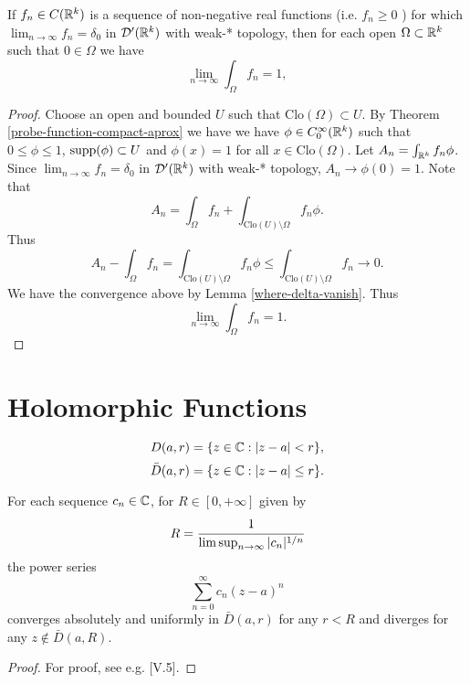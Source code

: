 \documentclass[main.tex]{subfiles}
\begin{document}
\begin{lemma}
If $f_n\in C(\mathbb{R}^k)$ is a sequence of non-negative real functions (i.e. $f_n \geq 0$ ) for which 
$\lim_{n\to\infty} f_n = \delta_0$ in $\mathcal{D}'(\mathbb{R}^k)$ with weak-* topology, then for each open $\Omega\subset \mathbb{R}^k$ such that $0\in\Omega$ we have
\begin{equation}
\lim_{n\to\infty}\int_{\Omega} f_n = 1,
\end{equation} 
\end{lemma}
\begin{proof}
Choose an open and bounded $U$ such that $\text{Clo}(\Omega)\subset U$.
By Theorem \ref{probe-function-compact-aprox} we have we have $\phi\in C^\infty_0(\mathbb{R}^k)$ such that $0 \leq \phi \leq 1$, $\text{supp}(\phi)\subset U$ and $\phi(x) = 1$ for all $x\in \text{Clo}(\Omega)$.
Let $A_n = \int_{\mathbb{R}^k}f_n \phi$. Since $\lim_{n\to\infty} f_n = \delta_0$ in $\mathcal{D}'(\mathbb{R}^k)$ with weak-* topology, $A_n\to \phi(0)=1$.
Note that
\begin{equation}
A_n = \int_\Omega f_n + \int_{\text{Clo}(U) \setminus \Omega} f_n \phi.
\end{equation}
Thus
\begin{equation}
A_n - \int_\Omega f_n = \int_{\text{Clo}(U) \setminus \Omega} f_n \phi \leq \int_{\text{Clo}(U) \setminus \Omega} f_n \to 0.
\end{equation}
We have the convergence above by Lemma \ref{where-delta-vanish}.
Thus
\begin{equation}
\lim_{n\to\infty}\int_{\Omega} f_n = 1.
\end{equation}
\end{proof}
\section{Holomorphic Functions}

\begin{definition}
\begin{equation}
D(a, r) = \{ z\in \mathbb{C}: |z - a| < r\},
\end{equation}
\begin{equation}
\bar{D}(a, r) = \{ z\in \mathbb{C}: |z - a| \leq r\}.
\end{equation}
\end{definition}

\begin{theorem}
For each sequence $c_n\in\mathbb{C}$, for $R\in[0, +\infty]$ given by
\begin{equation}
R = \cfrac{1}{\limsup_{n\to\infty} |c_n|^{1/n}}
\end{equation}
the power series
\begin{equation}
\sum_{n=0}^\infty c_n(z - a)^n
\end{equation}
converges absolutely and uniformly in $\bar{D}(a, r)$ for any $r < R$ and diverges for any $z\not\in \bar{D}(a, R)$.
\end{theorem}
\begin{proof}
For proof, see e.g. \cite{maurin1976}[V.5].
\end{proof}
\end{document}
